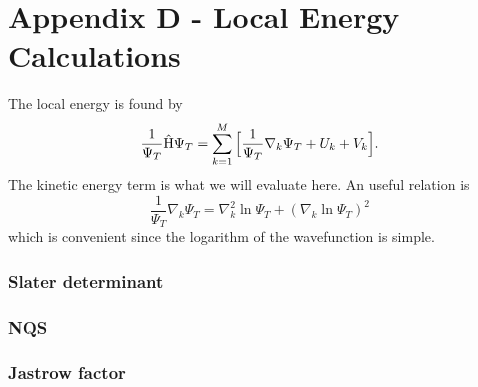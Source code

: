 \chapter{Appendix D - Local Energy Calculations}
The local energy is found by 
\begin{equation}
\frac{1}{\Psi_T}\hat{\text{H}}\Psi_T=\sum_{k=1}^M\Big[\frac{1}{\Psi_T}\nabla_k\Psi_T + U_k + V_k\Big].
\end{equation}
The kinetic energy term is what we will evaluate here. An useful relation is
\begin{equation}
\frac{1}{\Psi_T}\nabla_k\Psi_T=\nabla_k^2\ln\Psi_T + (\nabla_k\ln\Psi_T)^2
\end{equation}
which is convenient since the logarithm of the wavefunction is simple. 

\subsection{Slater determinant}

\subsection{NQS}

\subsection{Jastrow factor}